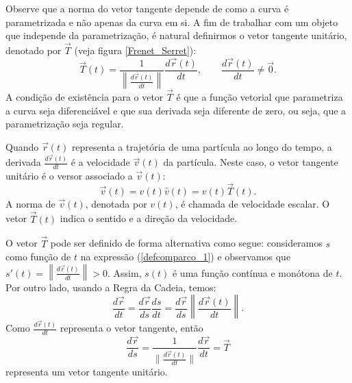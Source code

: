 Observe que a norma do vetor tangente depende de como a curva é parametrizada e não apenas da curva em si. A fim de trabalhar com um objeto que independe da parametrização, é natural definirmos o vetor tangente unitário, denotado por $\vec{T}$ (veja figura \ref{Frenet_Serret}):
\begin{equation}\label{defvecunit}
\vec{T}(t)=\frac{1}{\left\|\frac{d\vec{r}(t)}{dt}\right\|}\frac{d\vec{r}(t)}{dt},\qquad \frac{d\vec{r}(t)}{dt} \neq \vec{0}.
\end{equation} 
A condição de existência para o vetor $\vec{T}$ é que a função vetorial que parametriza a curva seja diferenciável e que sua derivada seja diferente de zero, ou seja, que a parametrização seja regular.

\begin{obs} Quando $\vec{r}(t)$ representa a trajetória de uma partícula ao longo do tempo, a derivada $\frac{d\vec{r}(t)}{dt} $ é a velocidade $\vec{v}(t)$ da partícula. Neste caso, o vetor tangente unitário é o versor associado a $\vec{v}(t)$:
$$\vec{v}(t)=v(t) \hat{v}(t)=v(t) \vec{T}(t).$$
A norma de $\vec{v}(t)$, denotada por $v(t)$, é chamada de velocidade escalar. O vetor $\vec{T}(t)$ indica o sentido e a direção da velocidade.
\end{obs}

O vetor $\vec{T}$ pode ser definido de forma alternativa como segue: consideramos $s$ como função de $t$ na expressão (\ref{defcomparco_1}) e observamos que $s'(t)=\left\|\frac{d\vec{r}(t)}{dt}\right\|>0$. Assim, $s(t)$ é uma função contínua e monótona de $t$. Por outro lado, usando a Regra da Cadeia, temos:
$$
\frac{d\vec{r}}{dt}=\frac{d\vec{r}}{ds}\frac{ds}{dt}=\frac{d\vec{r}}{ds}\left\|\frac{d\vec{r}(t)}{dt}\right\|.
$$
Como $\frac{d\vec{r}(t)}{dt}$ representa o vetor tangente, então
$$
\frac{d\vec{r}}{ds}=\frac{1}{\|\frac{d\vec{r}(t)}{dt}\|}\frac{d\vec{r}}{dt}=\vec{T}
$$
representa um vetor tangente unitário.


